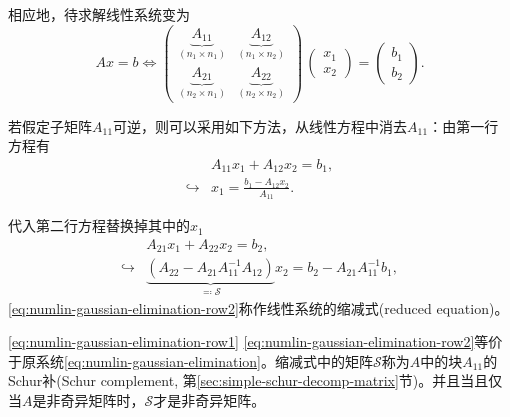 \begin{subappendices}
相应地，待求解线性系统变为
\begin{equation}
  \label{eq:numlin-gaussian-elimination}
  A x = b \Longleftrightarrow
  \begin{pmatrix}
    \underbrace{A_{11}}_{\left( n_{1} \times n_{1} \right)} &
    \underbrace{A_{12}}_{\left( n_{1} \times n_{2} \right)} \\
    \underbrace{A_{21}}_{\left( n_{2} \times n_{1} \right)}&
    \underbrace{A_{22}}_{\left( n_{2} \times n_{2} \right)}
  \end{pmatrix}
  \,
  \begin{pmatrix}
    x_{1} \\ x_{2}
  \end{pmatrix}
  =
  \begin{pmatrix}
      b_{1} \\
      b_{2}
  \end{pmatrix}.
\end{equation}

若假定子矩阵$A_{11}$可逆，则可以采用如下方法，从线性方程中消去$A_{11}$：由第一行方程有
\begin{equation}
  \label{eq:numlin-gaussian-elimination-row1}
  \begin{split}
    & A_{11} x_{1} + A_{12} x_{2} = b_{1}, \\
    \hookrightarrow & x_{1} = \frac{b_{1} - A_{12} x_{2}}{A_{11}}.
  \end{split}
\end{equation}

代入第二行方程替换掉其中的$x_{1}$
\begin{equation}
  \label{eq:numlin-gaussian-elimination-row2}
  \begin{split}
    & A_{21} x_{1} + A_{22} x_{2} = b_{2}, \\
    \hookrightarrow &
    \underbrace{
    \left( A_{22} - A_{21} A_{11}^{-1} A_{12} \right)
    }_{\eqqcolon \mathcal{S}}
    x_{2} = b_{2} - A_{21}A_{11}^{-1} b_{1},
  \end{split}
\end{equation}
\eqref{eq:numlin-gaussian-elimination-row2}称作线性系统的缩减式(reduced equation)。

\eqref{eq:numlin-gaussian-elimination-row1} \eqref{eq:numlin-gaussian-elimination-row2}等价于原系统\eqref{eq:numlin-gaussian-elimination}。缩减式中的矩阵$\mathcal{S}$称为$A$中的块$A_{11}$的Schur补(Schur complement, 第\ref{sec:simple-schur-decomp-matrix}节)。并且当且仅当$A$是非奇异矩阵时，$\mathcal{S}$才是非奇异矩阵。


\end{subappendices}
